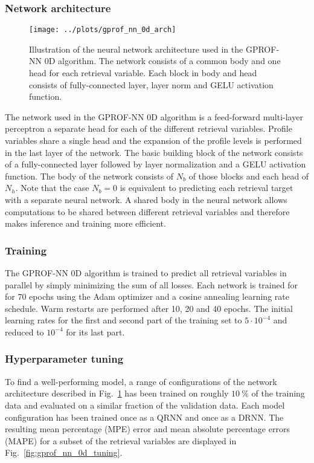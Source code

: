 \documentclass[a4paper,11pt,bibtotoc]{scrartcl}
\begin{document}
\subsubsection{Network architecture}

\begin{figure}[hbpt]
  \centering
    \texttt{[image: ../plots/gprof\_nn\_0d\_arch]}
    \caption{Illustration of the neural network architecture used in the
      GPROF-NN 0D algorithm. The network consists of a common body and
      one head for each retrieval variable. Each block in body and head
      consists of fully-connected layer, layer norm and GELU activation function.
    }
  \label{fig:gprof_nn_0d}
\end{figure}

The network used in the GPROF-NN 0D algorithm is a feed-forward multi-layer
perceptron a  separate head for each of the different retrieval variables.
Profile variables share a single head and the expansion of the profile levels
is performed in the last layer of the network. The basic building block of
the network consists of a fully-connected layer followed by layer normalization
and a GELU activation function. The body of the network consists of
$N_b$ of those blocks and each head of $N_h$. Note that the case $N_b = 0$ is
equivalent to predicting each retrieval target with a separate neural network.
A shared body in the neural network allows computations to be shared between
different retrieval variables and therefore makes inference and training more
efficient.

\subsubsection{Training}

The GPROF-NN 0D algorithm is trained to predict all retrieval variables in
parallel by simply minimizing the sum of all losses. Each network is trained for
for 70 epochs using the Adam optimizer and a cosine annealing learning rate
schedule. Warm restarts are performed after 10, 20 and 40 epochs. The initial
learning rates for the first and second part of the training set to $5\cdot
10^{-4}$ and reduced to $10^{-4}$ for its last part.

\subsubsection{Hyperparameter tuning}

To find a well-performing model, a range of configurations of the network
architecture described in Fig.~\ref{fig:gprof_nn_0d} has been trained on roughly
$10\ \unit{\%}$ of the training data and evaluated on a similar fraction of the
validation data. Each model configuration has been trained once as a QRNN and
once as a DRNN. The resulting mean percentage (MPE) error and mean absolute
percentage errors (MAPE) for a subset of the retrieval variables are displayed
in Fig.~\ref{fig:gprof_nn_0d_tuning}.
\end{document}
